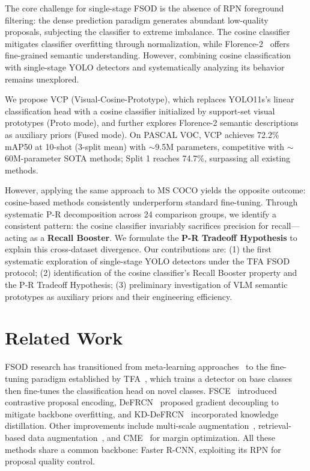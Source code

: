 \documentclass[conference]{IEEEtran}
\newcommand{\myhl}[1]{\colorbox{hlc}{\mbox{#1}}}
\begin{document}
The core challenge for single-stage FSOD is the absence of RPN foreground filtering: the dense prediction paradigm generates abundant low-quality proposals, subjecting the classifier to extreme imbalance. The cosine classifier~\cite{wang2020tfa} mitigates classifier overfitting through normalization, while Florence-2~\cite{xiao2024florence2} offers fine-grained semantic understanding. However, combining cosine classification with single-stage YOLO detectors and systematically analyzing its behavior remains unexplored.

We propose VCP (Visual-Cosine-Prototype), which replaces YOLO11s's linear classification head with a cosine classifier initialized by support-set visual prototypes (Proto mode), and further explores Florence-2 semantic descriptions as auxiliary priors (Fused mode). On PASCAL VOC, VCP achieves 72.2\% mAP50 at 10-shot (3-split mean) with $\sim$9.5M parameters, competitive with $\sim$60M-parameter SOTA methods; Split 1 reaches 74.7\%, surpassing all existing methods.

However, applying the same approach to MS COCO yields the opposite outcome: cosine-based methods consistently underperform standard fine-tuning. Through systematic P-R decomposition across 24 comparison groups, we identify a consistent pattern: the cosine classifier invariably sacrifices precision for recall---acting as a \textbf{Recall Booster}. We formulate the \textbf{P-R Tradeoff Hypothesis} to explain this cross-dataset divergence. Our contributions are: (1) the first systematic exploration of single-stage YOLO detectors under the TFA FSOD protocol; (2) identification of the cosine classifier's Recall Booster property and the P-R Tradeoff Hypothesis; (3) preliminary investigation of VLM semantic prototypes as auxiliary priors and their engineering efficiency.

\section{Related Work}

FSOD research has transitioned from meta-learning approaches~\myhl{\cite{huang2025prototype,gao2025decoupling}} to the fine-tuning paradigm established by TFA~\cite{wang2020tfa}, which trains a detector on base classes then fine-tunes the classification head on novel classes. FSCE~\cite{sun2021fsce} introduced contrastive proposal encoding, DeFRCN~\cite{qiao2021defrcn} proposed gradient decoupling to mitigate backbone overfitting, and KD-DeFRCN~\cite{pei2022kddefrcn} incorporated knowledge distillation. Other improvements include multi-scale augmentation~\myhl{\cite{vu2025multiperspective}}, retrieval-based data augmentation~\myhl{\cite{li2025domainrag}}, and CME~\cite{li2021cme} for margin optimization. All these methods share a common backbone: Faster R-CNN, exploiting its RPN for proposal quality control.
\end{document}
